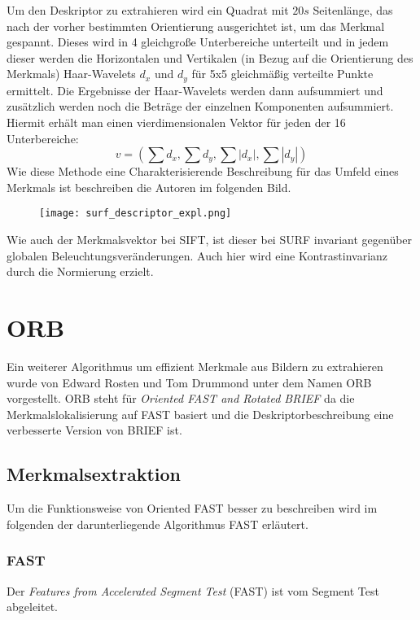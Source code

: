 Um den Deskriptor zu extrahieren wird ein Quadrat mit $20s$ Seitenlänge, das nach der vorher bestimmten Orientierung ausgerichtet ist, um das Merkmal gespannt.
Dieses wird in 4 gleichgroße Unterbereiche unterteilt und in jedem dieser werden die Horizontalen und Vertikalen (in Bezug auf die Orientierung des Merkmals) Haar-Wavelets $d_x$ und $d_y$ für 5x5 gleichmäßig verteilte Punkte ermittelt. 
Die Ergebnisse der Haar-Wavelets werden dann aufsummiert und zusätzlich werden noch die Beträge der einzelnen Komponenten aufsummiert.
Hiermit erhält man einen vierdimensionalen Vektor für jeden der 16 Unterbereiche:
\begin{equation}
v=(\sum d_x, \sum d_y, \sum |d_x|, \sum |d_y|)
\end{equation}
Wie diese Methode eine Charakterisierende Beschreibung für das Umfeld eines Merkmals ist beschreiben die Autoren im folgenden Bild.

\begin{figure}[h]
\texttt{[image: surf\_descriptor\_expl.png]}
\centering
\end{figure}

Wie auch der Merkmalsvektor bei SIFT, ist dieser bei SURF invariant gegenüber globalen Beleuchtungsveränderungen. Auch hier wird eine Kontrastinvarianz durch die Normierung erzielt.

\section{ORB}

Ein weiterer Algorithmus um effizient Merkmale aus Bildern zu extrahieren wurde von Edward Rosten und Tom Drummond unter dem Namen ORB vorgestellt.
ORB steht für \emph{Oriented FAST and Rotated BRIEF} da die Merkmalslokalisierung auf FAST basiert und die Deskriptorbeschreibung eine verbesserte Version von BRIEF ist.

\subsection{Merkmalsextraktion}
Um die Funktionsweise von Oriented FAST besser zu beschreiben wird im folgenden der darunterliegende Algorithmus FAST erläutert.
\subsubsection{FAST}

Der \emph{Features from Accelerated Segment Test} (FAST) ist vom Segment Test abgeleitet.

